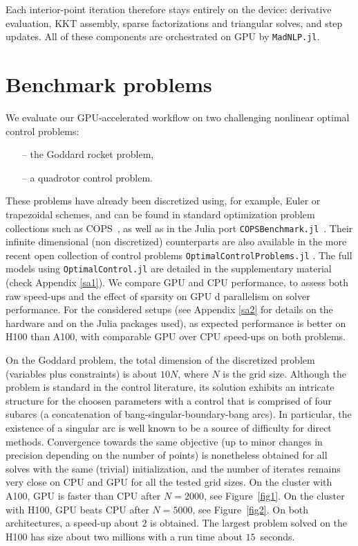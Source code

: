 Each interior-point iteration therefore stays entirely on the device: derivative evaluation, KKT assembly, sparse factorizations and triangular solves, and step updates.  
All of these components are orchestrated on GPU by \texttt{MadNLP.jl}.

\section{Benchmark problems} \label{s6}

We evaluate our GPU-accelerated workflow on two challenging nonlinear optimal control problems: 
\begin{itemize}
    \item[--] the Goddard rocket problem,
    \item[--] a quadrotor control problem.
\end{itemize}
These problems have already been discretized using, for example, Euler or trapezoidal schemes, and can be found in standard optimization problem collections such as COPS~\cite{bondarenko2000cops}, as well as in the Julia port \texttt{COPSBenchmark.jl}~\cite{COPS_jl}.
 Their infinite dimensional (non discretized) counterparts are also available in the more recent open collection of control problems \texttt{OptimalControlProblems.jl} \cite{OCP_jl}. The full models using \texttt{OptimalControl.jl} are detailed in the supplementary material (check Appendix \ref{sa1}).
%
We compare GPU and CPU performance,
to assess both raw speed-ups and the effect of sparsity on GPU d parallelism on solver performance.
For the considered setups (see Appendix \ref{sa2} for details on the hardware and on the Julia packages used), as expected performance is better on H100 than A100, with comparable GPU over CPU speed-ups on both problems.

On the Goddard problem, the total dimension of the discretized problem (variables plus constraints) is about $10 N$, where $N$ is the grid size. Although the problem is standard in the control literature, its solution exhibits an intricate structure for the choosen parameters with a control that is comprised of four subarcs (a concatenation of bang-singular-boundary-bang arcs). In particular, the existence of a singular arc is well known to be a source of difficulty for direct methods. Convergence towards the same objective (up to minor changes in precision depending on the number of points) is nonetheless obtained for all solves with the same (trivial) initialization, and the number of iterates remains very close on CPU and GPU for all the tested grid sizes.
On the cluster with A100, GPU is faster than CPU after $N = 2000$, see Figure~\ref{fig1}.
On the cluster with H100, GPU beats CPU after $N = 5000$, see Figure~\ref{fig2}.
On both architectures, a speed-up about $2$ is obtained.
The largest problem solved on the H100 has size about two millions with a run time about $15$~seconds.

